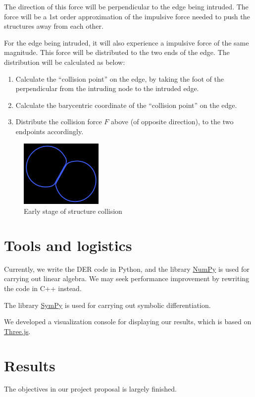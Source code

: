 \documentclass[letterpaper,9pt,twocolumn]{extarticle}
\begin{document}
			The direction of this force will be perpendicular to the edge being intruded. The force will be a 1st order approximation of the impulsive force needed to push the structures away from each other.
			
			For the edge being intruded, it will also experience a impulsive force of the same magnitude. This force will be distributed to the two ends of the edge. The distribution will be calculated as below:
			\begin{enumerate}
				\item Calculate the ``collision point'' on the edge, by taking the foot of the perpendicular from the intruding node to the intruded edge.
				\item Calculate the barycentric coordinate of the ``collision point'' on the edge.
				\item Distribute the collision force $F$ above (of opposite direction), to the two endpoints accordingly.
			\end{enumerate} 
		\begin{figure}[ht]
			\centering
			\includegraphics[width=4cm]{res/collision.png}
			\caption{Early stage of structure collision}
			\label{collision}
		\end{figure}
\section{Tools and logistics}
	Currently, we write the DER code in Python, and the library \href{http://www.numpy.org}{NumPy} is used for carrying out linear algebra. We may seek performance improvement by rewriting the code in C++ instead.
	
	The library \href{http://www.sympy.org/}{SymPy} is used for carrying out symbolic differentiation.
	
	We developed a visualization console for displaying our results, which is based on \href{https://threejs.org/}{Three.js}.	
\section{Results}
	The objectives in our project proposal is largely finished.
	
\end{document}

